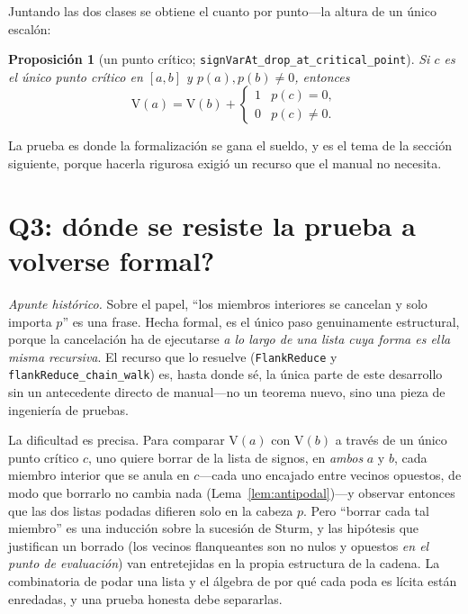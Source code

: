 \documentclass[11pt]{article}
\newtheorem{proposition}{Proposici\'on}
\newcommand{\lean}[1]{\texttt{#1}}
\newcommand{\V}{\mathrm{V}}
\begin{document}
Juntando las dos clases se obtiene el cuanto por punto---la altura de un \'unico escal\'on:
\begin{proposition}[un punto cr\'itico; \lean{signVarAt\_drop\_at\_critical\_point}]
\label{prop:quantum}
Si $c$ es el \'unico punto cr\'itico en $[a,b]$ y $p(a),p(b)\ne0$, entonces
\[
  \V(a)=\V(b)+\begin{cases}1 & p(c)=0,\\ 0 & p(c)\ne0.\end{cases}
\]
\end{proposition}
La prueba es donde la formalizaci\'on se gana el sueldo, y es el tema de la secci\'on siguiente,
porque hacerla rigurosa exigi\'o un recurso que el manual no necesita.

\section{Q3: \textquestiondown d\'onde se resiste la prueba a volverse formal?}\label{sec:q3}

\emph{Apunte hist\'orico.} Sobre el papel, ``los miembros interiores se cancelan y solo importa $p$''
es una frase. Hecha formal, es el \'unico paso genuinamente estructural, porque la cancelaci\'on ha de
ejecutarse \emph{a lo largo de una lista cuya forma es ella misma recursiva}. El recurso que lo
resuelve (\lean{FlankReduce} y \lean{flankReduce\_chain\_walk}) es, hasta donde s\'e, la \'unica parte
de este desarrollo sin un antecedente directo de manual---no un teorema nuevo, sino una pieza de
ingenier\'ia de pruebas.

La dificultad es precisa. Para comparar $\V(a)$ con $\V(b)$ a trav\'es de un \'unico punto cr\'itico
$c$, uno quiere borrar de la lista de signos, en \emph{ambos} $a$ y $b$, cada miembro interior que se
anula en $c$---cada uno encajado entre vecinos opuestos, de modo que borrarlo no cambia nada
(Lema~\ref{lem:antipodal})---y observar entonces que las dos listas podadas difieren solo en la cabeza
$p$. Pero ``borrar cada tal miembro'' es una inducci\'on sobre la sucesi\'on de Sturm, y las
hip\'otesis que justifican un borrado (los vecinos flanqueantes son no nulos y opuestos \emph{en el
punto de evaluaci\'on}) van entretejidas en la propia estructura de la cadena. La combinatoria de
podar una lista y el \'algebra de por qu\'e cada poda es l\'icita est\'an enredadas, y una prueba
honesta debe separarlas.
\end{document}

